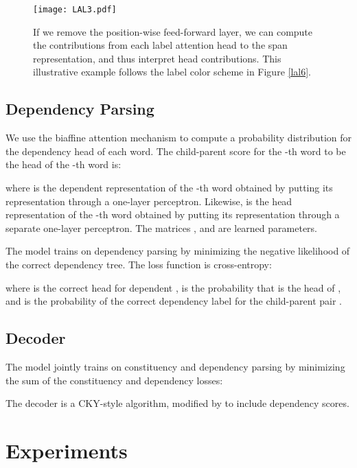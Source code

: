\documentclass[11pt,a4paper]{article}
\begin{document}
\begin{figure*}
    \centering
    \texttt{[image: LAL3.pdf]}
    \caption{If we remove the position-wise feed-forward layer, we can compute the contributions from each label attention head to the span representation, and thus interpret head contributions. This illustrative example follows the label color scheme in Figure \ref{lal6}.}
    \label{lal3}
\end{figure*}

\subsection{Dependency Parsing}

We use the biaffine attention mechanism \cite{dozat2016deep} to compute a probability distribution for the dependency head of each word. The child-parent score  for the -th word to be the head of the -th word is:



\noindent where  is the dependent representation of the -th word obtained by putting its representation  through a one-layer perceptron. Likewise,  is the head representation of the -th word obtained by putting its representation  through a separate one-layer perceptron. The matrices ,  and  are learned parameters.

The model trains on dependency parsing by minimizing the negative likelihood of the correct dependency tree. The loss function is cross-entropy:



\noindent where  is the correct head for dependent ,  is the probability that  is the head of , and  is the probability of the correct dependency label  for the child-parent pair .

\subsection{Decoder}

The model jointly trains on constituency and dependency parsing by minimizing the sum of the constituency and dependency losses:



The decoder is a CKY-style \cite{kasami1966efficient, younger1967recognition, cocke1969programming, stern2017minimal} algorithm, modified by \citet{zhou2019head} to include dependency scores.

\section{Experiments}
\label{section_exp}
\end{document}

